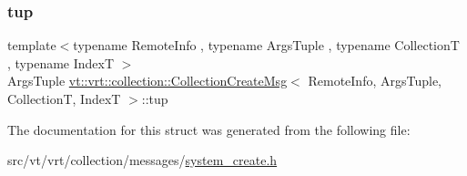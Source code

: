 \subsubsection{\texorpdfstring{tup}{tup}}
{\footnotesize\ttfamily template$<$typename Remote\+Info , typename Args\+Tuple , typename CollectionT , typename IndexT $>$ \\
Args\+Tuple \hyperlink{structvt_1_1vrt_1_1collection_1_1_collection_create_msg}{vt\+::vrt\+::collection\+::\+Collection\+Create\+Msg}$<$ Remote\+Info, Args\+Tuple, CollectionT, IndexT $>$\+::tup}



The documentation for this struct was generated from the following file\+:\begin{DoxyCompactItemize}
\item 
src/vt/vrt/collection/messages/\hyperlink{system__create_8h}{system\+\_\+create.\+h}\end{DoxyCompactItemize}
